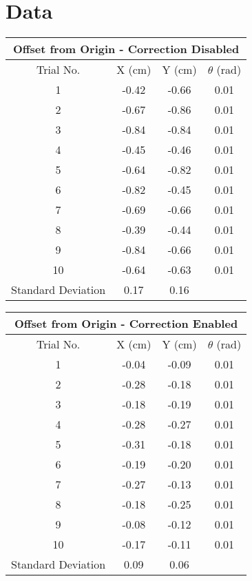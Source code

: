 \documentclass[11pt]{article} %
\begin{document}
\section{Data}
\begin{center}
\begin{tabular}{ | c | c | c | c | }
\multicolumn{4}{c}{Offset from Origin - Correction Disabled} \\ \hline
Trial No. & X (cm) & Y (cm) & $\theta$ (rad)\\ \hline
1 & -0.42 & -0.66 & 0.01 \\ \hline
2 & -0.67 & -0.86 & 0.01 \\ \hline
3 & -0.84 & -0.84 & 0.01 \\ \hline
4 & -0.45 & -0.46 & 0.01 \\ \hline
5 & -0.64 & -0.82 & 0.01 \\ \hline
6 & -0.82 & -0.45 & 0.01 \\ \hline
7 & -0.69 & -0.66 & 0.01 \\ \hline
8 & -0.39 & -0.44 & 0.01 \\ \hline
9 & -0.84 & -0.66 & 0.01 \\ \hline
10 & -0.64 & -0.63 & 0.01 \\ \hline
Standard Deviation & 0.17 & 0.16 & \\ \hline
\end{tabular}
\end{center}

\begin{center}
\begin{tabular}{ | c | c | c | c | }
\multicolumn{4}{c}{Offset from Origin - Correction Enabled} \\ \hline
Trial No. & X (cm) & Y (cm) & $\theta$ (rad)\\ \hline
1 & -0.04 & -0.09 & 0.01 \\ \hline
2 & -0.28 & -0.18 & 0.01 \\ \hline
3 & -0.18 & -0.19 & 0.01 \\ \hline
4 & -0.28 & -0.27 & 0.01 \\ \hline
5 & -0.31 & -0.18 & 0.01 \\ \hline
6 & -0.19 & -0.20 & 0.01 \\ \hline
7 & -0.27 & -0.13 & 0.01 \\ \hline
8 & -0.18 & -0.25 & 0.01 \\ \hline
9 & -0.08 & -0.12 & 0.01 \\ \hline
10 & -0.17 & -0.11 & 0.01 \\ \hline
Standard Deviation & 0.09 & 0.06 & \\ \hline
\end{tabular}
\end{center}
\end{document}
